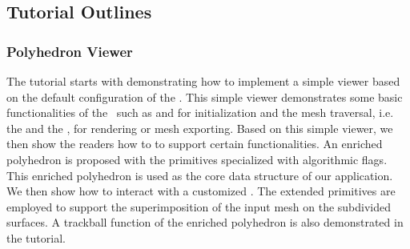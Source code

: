 \documentclass[letter,twocolumn]{article}
\begin{document}
\subsection*{Tutorial Outlines}

\subsubsection*{Polyhedron Viewer}


The tutorial starts with demonstrating how to implement a simple
viewer based on the default configuration of the \cgalpoly . This
simple viewer demonstrates some basic functionalities of the
\cgalpoly\ such as  and  
for initialization and the mesh traversal, i.e. the 
and the , for rendering or mesh exporting. Based
on this simple viewer, we then show the readers how to
 to support certain functionalities. 
An enriched polyhedron is proposed with the primitives specialized
with algorithmic flags. This enriched polyhedron is used as the core
data structure of our application.  We then show how to interact with
a customized \poly.  The extended primitives are employed to support
the superimposition of the input mesh on the subdivided surfaces. A
trackball function of the enriched polyhedron is also demonstrated in
the tutorial.
\end{document}
